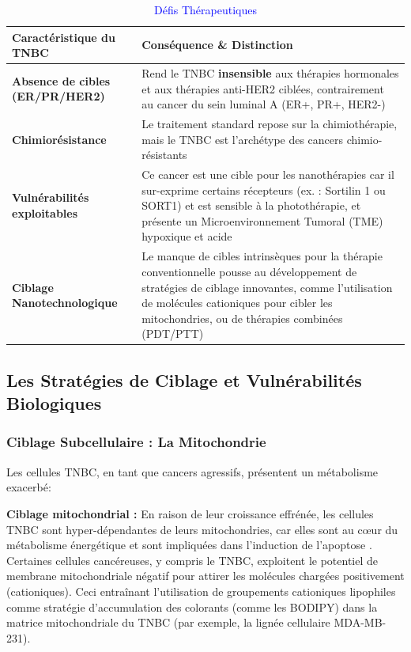 \begin{table}[h]
\centering
\caption{\textcolor{blue}{Défis Thérapeutiques}}
\small
\begin{tabular}{|>{\raggedright\arraybackslash}m{4cm}|>{\raggedright\arraybackslash}m{8cm}|}
\hline
\textbf{Caractéristique du TNBC} & \textbf{Conséquence \& Distinction} \\
\hline
\textbf{Absence de cibles (ER/PR/HER2)} & Rend le TNBC \textbf{insensible} aux thérapies hormonales et aux thérapies anti-HER2 ciblées, contrairement au cancer du sein luminal A (ER+, PR+, HER2-)  \cite{Ma2025, Paulson2025} \\
\hline
\textbf{Chimiorésistance} & Le traitement standard repose sur la chimiothérapie, mais le TNBC est l'archétype des cancers chimio-résistants \cite{Kong_2023, Paulson2025, Lebedeva2025} \\
\hline
\textbf{Vulnérabilités exploitables} & Ce cancer est une cible pour les nanothérapies car il sur-exprime certains récepteurs (ex. : Sortilin 1 ou SORT1) et est sensible à la photothérapie, et présente un Microenvironnement Tumoral (TME) hypoxique et acide \cite{Ailioaie2025, Duan2024,Demeule2021} \\
\hline
\textbf{Ciblage Nanotechnologique} & Le manque de cibles intrinsèques pour la thérapie conventionnelle pousse au développement de stratégies de ciblage innovantes, comme l'utilisation de molécules cationiques pour cibler les mitochondries, ou de thérapies combinées (PDT/PTT)  \cite{WasifBaig2025, Cui2025}\\
\hline
\end{tabular}
\end{table}

\subsection{Les Stratégies de Ciblage et Vulnérabilités Biologiques}

\subsubsection{Ciblage Subcellulaire : La Mitochondrie}

Les cellules TNBC, en tant que cancers agressifs, présentent un métabolisme exacerbé:

\textbf{Ciblage mitochondrial :} En raison de leur croissance effrénée, les cellules TNBC sont hyper-dépendantes de leurs mitochondries, car elles sont au c\oe{}ur du métabolisme énergétique et sont impliquées dans l'induction de l'apoptose  \cite{Ailioaie2025, Lee2024}. Certaines cellules cancéreuses, y compris le TNBC, exploitent le potentiel de membrane mitochondriale négatif pour attirer les molécules chargées positivement (cationiques). Ceci entraînant l'utilisation de groupements cationiques lipophiles comme stratégie d'accumulation des colorants (comme les BODIPY) dans la matrice mitochondriale du TNBC (par exemple, la lignée cellulaire MDA-MB-231)\cite{Ahmad2025, Bongo2025, Badon2023}.

